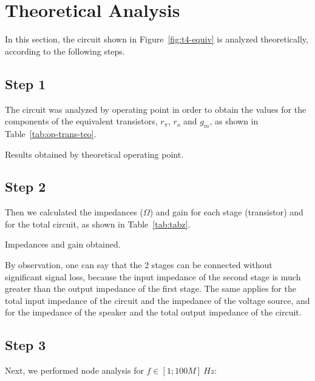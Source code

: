 \section{Theoretical Analysis}
\label{sec:analysis}

In this section, the circuit shown in Figure~\ref{fig:t4-equiv} is analyzed
theoretically, according to the following steps.

\subsection{Step 1}\label{subsec:step1}
The circuit was analyzed by operating point in order to obtain the values for the components
of the equivalent transistors, $r_{\pi}$, $r_o$ and $g_m$, as shown in
Table~\ref{tab:op-trans-teo}.

\begin{table}[ht!]
  \centering
  
  \caption{Results obtained by theoretical operating point.}
  \label{tab:op-trans-teo}
\end{table}


\subsection{Step 2}\label{subsec:step2}
Then we calculated the impedances ($\Omega$) and gain for each stage (transistor) and for the total circuit, as shown in Table~\ref{tab:tabz}.


\begin{table}[ht!]
  \centering
  
  \caption{Impedances and gain obtained.}
  \label{tab:tabz}
\end{table}

By observation, one can say that the 2 stages can be connected without significant signal loss, because the input impedance of the second stage is much greater than the output impedance of the first stage. The same applies for the total input impedance of the circuit and the impedance of the voltage source, and for the impedance of the speaker and the total output impedance of the circuit.


\subsection{Step 3}\label{subsec:step3}
Next, we performed node analysis for $f \in [1; 100M]\ Hz$:

